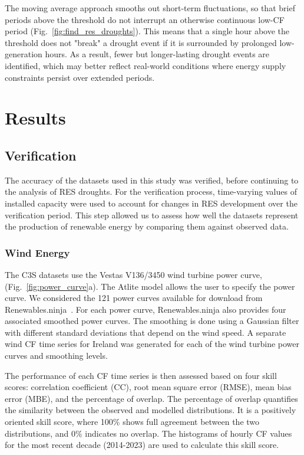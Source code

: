 \documentclass[preprint, 12pt]{elsarticle}
\begin{document}
The moving average approach smooths out short-term fluctuations, so that brief periods above the threshold do not interrupt an otherwise continuous low-CF period (Fig.~\ref{fig:find_res_droughts}). This means that a single hour above the threshold does not "break" a drought event if it is surrounded by prolonged low-generation hours. As a result, fewer but longer-lasting drought events are identified, which may better reflect real-world conditions where energy supply constraints persist over extended periods.

\section{Results}
\label{sec:results}

\subsection{Verification}
\label{sec:verification}

The accuracy of the datasets used in this study was verified, before continuing to the analysis of RES droughts. For the verification process, time-varying values of installed capacity were used to account for changes in RES development over the verification period. This step allowed us to assess how well the datasets represent the production of renewable energy by comparing them against observed data.

\subsubsection{Wind Energy}
\label{sec:wind_verification}

The C3S datasets use the Vestas V136/3450 wind turbine power curve, (Fig.~\ref{fig:power_curve}a). The Atlite model allows the user to specify the power curve. We considered the 121 power curves available for download from Renewables.ninja~\citep{staffell2016wake}. For each power curve, Renewables.ninja also provides four associated smoothed power curves. The smoothing is done using a Gaussian filter with different standard deviations that depend on the wind speed. A separate wind CF time series for Ireland was generated for each of the wind turbine power curves and smoothing levels.

The performance of each CF time series is then assessed based on four skill scores: correlation coefficient (CC), root mean square error (RMSE), mean bias error (MBE), and the percentage of overlap. The percentage of overlap quantifies the similarity between the observed and modelled distributions. It is a positively oriented skill score, where 100\% shows full agreement between the two distributions, and 0\% indicates no overlap. The histograms of hourly CF values for the most recent decade (2014-2023) are used to calculate this skill score.
\end{document}
